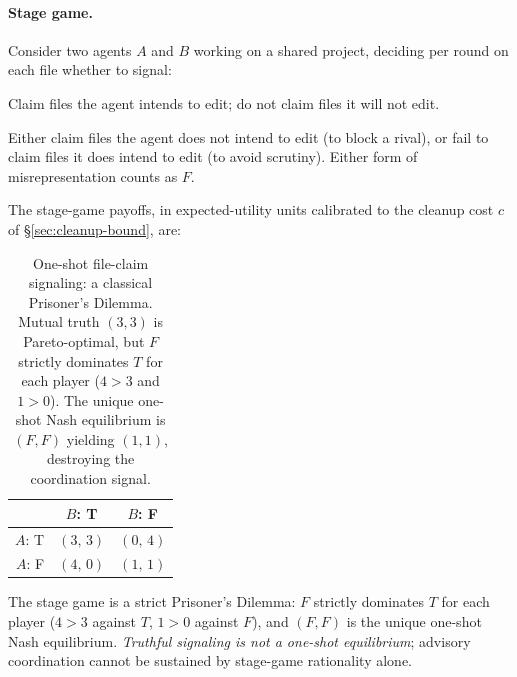\documentclass[11pt,a4paper]{article}
\theoremstyle{definition}
\theoremstyle{remark}
\begin{document}
\paragraph{Stage game.}
Consider two agents $A$ and $B$ working on a shared project, deciding per round on each file whether to signal:
\begin{description}[nosep]
  \item[\textbf{T (Truthful).}] Claim files the agent intends to edit; do not claim files it will not edit.
  \item[\textbf{F (False).}] Either claim files the agent does not intend to edit (to block a rival), or fail to claim files it does intend to edit (to avoid scrutiny). Either form of misrepresentation counts as $F$.
\end{description}

The stage-game payoffs, in expected-utility units calibrated to the cleanup cost $c$ of \S\ref{sec:cleanup-bound}, are:

\begin{table}[H]
\centering
\caption{One-shot file-claim signaling: a classical Prisoner's Dilemma. Mutual truth $(3,3)$ is Pareto-optimal, but $F$ strictly dominates $T$ for each player ($4>3$ and $1>0$). The unique one-shot Nash equilibrium is $(F,F)$ yielding $(1,1)$, destroying the coordination signal.}
\label{tab:claim-stage-game}
\begin{tabular}{@{}rcc@{}}
\toprule
 & $B$: T & $B$: F \\
\midrule
$A$: T & $(3,\,3)$ & $(0,\,4)$ \\
$A$: F & $(4,\,0)$ & $(1,\,1)$ \\
\bottomrule
\end{tabular}
\end{table}

The stage game is a strict Prisoner's Dilemma: $F$ strictly dominates $T$ for each player ($4 > 3$ against $T$, $1 > 0$ against $F$), and $(F, F)$ is the unique one-shot Nash equilibrium. \emph{Truthful signaling is not a one-shot equilibrium}; advisory coordination cannot be sustained by stage-game rationality alone.
\end{document}
